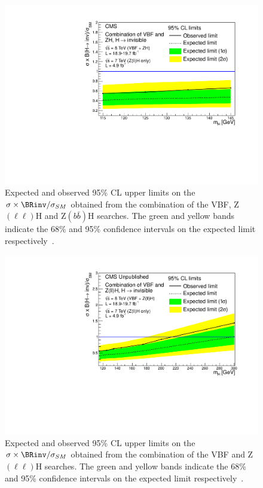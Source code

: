 \begin{figure}
  \includegraphics[width=\largefigwidth]{plots/prompt/HIG-13-30-figs/combinedlimit.pdf}
  \caption{Expected and observed 95\% \ac{CL} upper limits on the $\sigma\times\BRinv/\sigma_{SM}$ obtained from the combination of the \ac{VBF}, Z$(\ell\ell)$H and Z$(b\bar{b})$H searches. The green and yellow bands indicate the 68\% and 95\% confidence intervals on the expected limit respectively~\cite{Chatrchyan:2014tja}.}
  \label{fig:promptcomb}
\end{figure}

\begin{figure}
  \includegraphics[width=\largefigwidth]{plots/prompt/HIG-13-30-figs/highmasslimit.pdf}
  \caption{Expected and observed 95\% \ac{CL} upper limits on the $\sigma\times\BRinv/\sigma_{SM}$ obtained from the combination of the \ac{VBF} and Z$(\ell\ell)$H searches. The green and yellow bands indicate the 68\% and 95\% confidence intervals on the expected limit respectively~\cite{Chatrchyan:2014tja}.}
  \label{fig:promptcombhighmass}
\end{figure}

